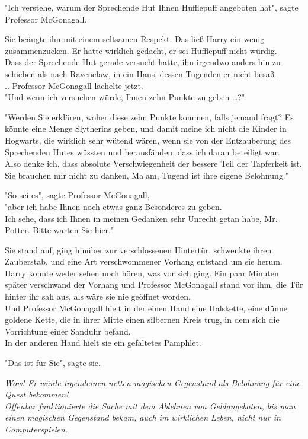 {"Ich verstehe, warum der Sprechende Hut Ihnen Hufflepuff angeboten hat", sagte Professor McGonagall.

Sie beäugte ihn mit einem seltsamen Respekt. Das ließ Harry ein wenig zusammenzucken. Er hatte wirklich gedacht, er sei Hufflepuff nicht würdig.\\ Dass der Sprechende Hut gerade versucht hatte, ihn irgendwo anders hin zu schieben als nach Ravenclaw, in ein Haus, dessen Tugenden er nicht besaß.\\ .. Professor McGonagall lächelte jetzt.\\ "Und wenn ich versuchen würde, Ihnen zehn Punkte zu geben …?"

"Werden Sie erklären, woher diese zehn Punkte kommen, falls jemand fragt? Es könnte eine Menge Slytherins geben, und damit meine ich nicht die Kinder in Hogwarts, die wirklich sehr wütend wären, wenn sie von der Entzauberung des Sprechenden Hutes wüssten und herausfänden, dass ich daran beteiligt war.\\ Also denke ich, dass absolute Verschwiegenheit der bessere Teil der Tapferkeit ist. Sie brauchen mir nicht zu danken, Ma'am, Tugend ist ihre eigene Belohnung."

"So sei es", sagte Professor McGonagall,\\ "aber ich habe Ihnen noch etwas ganz Besonderes zu geben.\\ Ich sehe, dass ich Ihnen in meinen Gedanken sehr Unrecht getan habe, Mr. Potter. Bitte warten Sie hier."

Sie stand auf, ging hinüber zur verschlossenen Hintertür, schwenkte ihren Zauberstab, und eine Art verschwommener Vorhang entstand um sie herum.\\ Harry konnte weder sehen noch hören, was vor sich ging. Ein paar Minuten später verschwand der Vorhang und Professor McGonagall stand vor ihm, die Tür hinter ihr sah aus, als wäre sie nie geöffnet worden.\\ Und Professor McGonagall hielt in der einen Hand eine Halskette, eine dünne goldene Kette, die in ihrer Mitte einen silbernen Kreis trug, in dem sich die Vorrichtung einer Sanduhr befand.\\ In der anderen Hand hielt sie ein gefaltetes Pamphlet.

"Das ist für Sie", sagte sie.

\emph{Wow! Er würde irgendeinen netten magischen Gegenstand als Belohnung für eine Quest bekommen!\\ Offenbar funktionierte die Sache mit dem Ablehnen von Geldangeboten, bis man einen magischen Gegenstand bekam, auch im wirklichen Leben, nicht nur in Computerspielen.}

}
